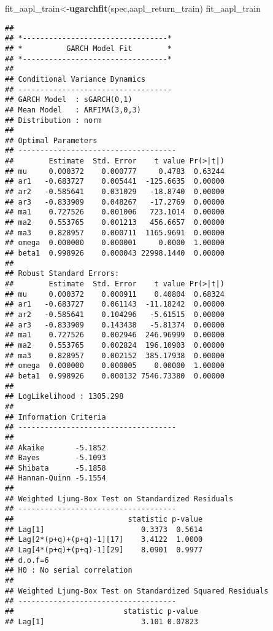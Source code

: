 \documentclass[
]{article}
\newenvironment{Shaded}{\begin{snugshade}}{\end{snugshade}}
\newcommand{\FunctionTok}[1]{\textcolor[rgb]{0.13,0.29,0.53}{\textbf{#1}}}
\newcommand{\NormalTok}[1]{#1}
\newcommand{\OtherTok}[1]{\textcolor[rgb]{0.56,0.35,0.01}{#1}}
\begin{document}
\begin{Shaded}
\begin{Highlighting}[]
\NormalTok{fit\_aapl\_train}\OtherTok{\textless{}{-}}\FunctionTok{ugarchfit}\NormalTok{(spec,aapl\_return\_train)}
\NormalTok{fit\_aapl\_train}
\end{Highlighting}
\end{Shaded}

\begin{verbatim}
## 
## *---------------------------------*
## *          GARCH Model Fit        *
## *---------------------------------*
## 
## Conditional Variance Dynamics    
## -----------------------------------
## GARCH Model  : sGARCH(0,1)
## Mean Model   : ARFIMA(3,0,3)
## Distribution : norm 
## 
## Optimal Parameters
## ------------------------------------
##        Estimate  Std. Error    t value Pr(>|t|)
## mu     0.000372    0.000777     0.4783  0.63244
## ar1   -0.683727    0.005441  -125.6635  0.00000
## ar2   -0.585641    0.031029   -18.8740  0.00000
## ar3   -0.833909    0.048267   -17.2769  0.00000
## ma1    0.727526    0.001006   723.1014  0.00000
## ma2    0.553765    0.001213   456.6657  0.00000
## ma3    0.828957    0.000711  1165.9691  0.00000
## omega  0.000000    0.000001     0.0000  1.00000
## beta1  0.998926    0.000043 22998.1440  0.00000
## 
## Robust Standard Errors:
##        Estimate  Std. Error    t value Pr(>|t|)
## mu     0.000372    0.000911    0.40804  0.68324
## ar1   -0.683727    0.061143  -11.18242  0.00000
## ar2   -0.585641    0.104296   -5.61515  0.00000
## ar3   -0.833909    0.143438   -5.81374  0.00000
## ma1    0.727526    0.002946  246.96999  0.00000
## ma2    0.553765    0.002824  196.10903  0.00000
## ma3    0.828957    0.002152  385.17938  0.00000
## omega  0.000000    0.000005    0.00000  1.00000
## beta1  0.998926    0.000132 7546.73380  0.00000
## 
## LogLikelihood : 1305.298 
## 
## Information Criteria
## ------------------------------------
##                     
## Akaike       -5.1852
## Bayes        -5.1093
## Shibata      -5.1858
## Hannan-Quinn -5.1554
## 
## Weighted Ljung-Box Test on Standardized Residuals
## ------------------------------------
##                          statistic p-value
## Lag[1]                      0.3373  0.5614
## Lag[2*(p+q)+(p+q)-1][17]    3.4122  1.0000
## Lag[4*(p+q)+(p+q)-1][29]    8.0901  0.9977
## d.o.f=6
## H0 : No serial correlation
## 
## Weighted Ljung-Box Test on Standardized Squared Residuals
## ------------------------------------
##                         statistic p-value
## Lag[1]                      3.101 0.07823

\end{verbatim}
\end{document}

